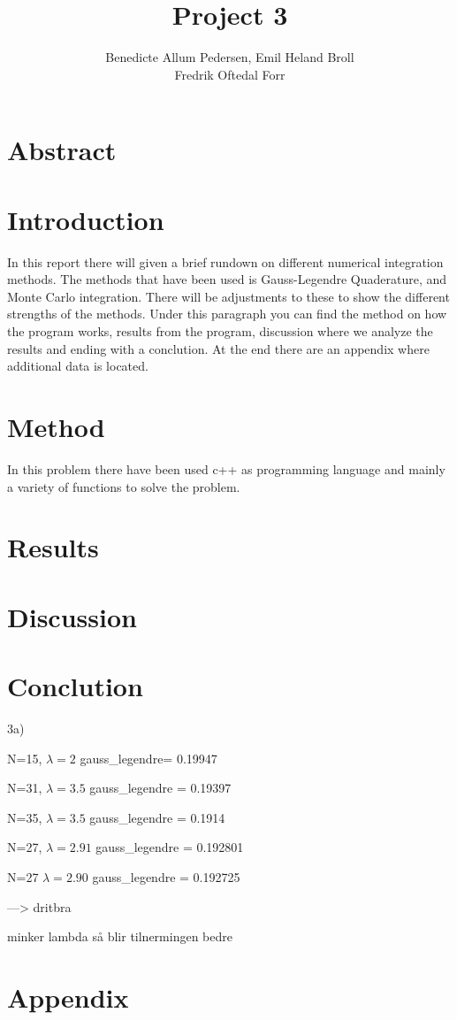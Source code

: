 \documentclass{article}
\title{Project 3}\vspace{-3ex}
\author{Benedicte Allum Pedersen, Emil Heland Broll\\ Fredrik Oftedal Forr}
\date{\vspace{-5ex}}
\begin{document}
\maketitle

\section*{Abstract}


\section*{Introduction}
In this report there will given a brief rundown on different numerical integration methods. The methods that have been used is Gauss-Legendre Quaderature, and Monte Carlo integration. There will be adjustments to these to show the different strengths of the methods. Under this paragraph you can find the method on how the program works, results from the program, discussion where we analyze the results and ending with a conclution. At the end there are an appendix where additional data is located.

\section*{Method}
In this problem there have been used c++ as programming language and mainly a variety of functions to solve the problem. 

\section*{Results}


\section*{Discussion}


\section*{Conclution}

3a)

N=15, $\lambda = 2$ gauss_legendre= 0.19947

N=31, $\lambda = 3.5$ gauss_legendre = 0.19397

N=35, $\lambda = 3.5$ gauss_legendre = 0.1914

N=27, $\lambda = 2.91$ gauss_legendre = 0.192801

N=27 $\lambda = 2.90$ gauss_legendre = 0.192725

---> dritbra

minker lambda så blir tilnermingen bedre


\section*{Appendix}
\end{document}
